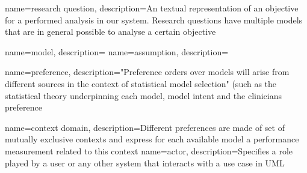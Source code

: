 \newpage
{}





{
  name={research question},
  description={An textual representation of an objective for a performed analysis in our system. Research questions have multiple models that are in general possible to analyse a certain objective}
}

{
  name={model},
  description={}
}
{
  name={assumption},
  description={}
}

{
  name={preference},
  description={"Preference orders over models will arise from different sources in the context of statistical model selection" (such as the statistical theory underpinning each model, model intent and the clinicians preference \cite{sassoon2016CD}}
}

{
  name={context domain},
  description={Different preferences are made of set of mutually exclusive contexts and express for each available model a performance measurement related to this context \cite{sassoon2016CD}}
}
{
  name={actor},
  description={Specifies a role played by a user or any other system that interacts with a use case in UML}
}

